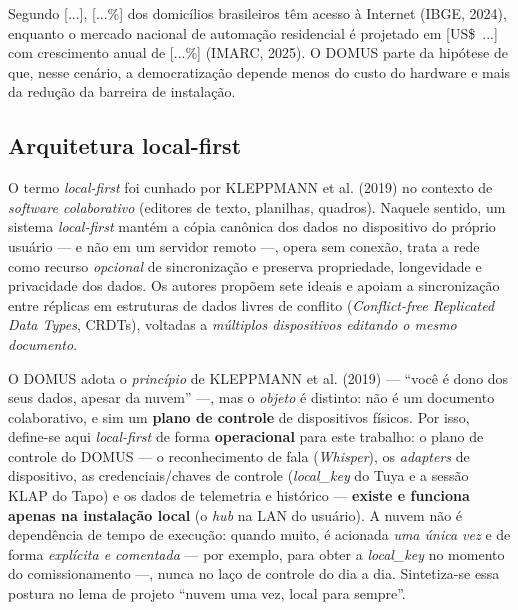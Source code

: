 Segundo [...], [...\%] dos domicílios brasileiros têm acesso à Internet
(IBGE, 2024), enquanto o mercado nacional de automação residencial é projetado em
[US\$~...] com crescimento anual de [...\%] (IMARC, 2025). O DOMUS parte da
hipótese de que, nesse cenário, a democratização depende menos do custo do
hardware e mais da redução da barreira de instalação.

\subsection{Arquitetura local-first}\label{sec:local-first}

O termo \textit{local-first} foi cunhado por KLEPPMANN et al. (2019) no contexto
de \textit{software colaborativo} (editores de texto, planilhas, quadros). Naquele
sentido, um sistema \textit{local-first} mantém a cópia canônica dos dados no
dispositivo do próprio usuário --- e não em um servidor remoto ---, opera sem
conexão, trata a rede como recurso \textit{opcional} de sincronização e preserva
propriedade, longevidade e privacidade dos dados. Os autores propõem sete ideais e
apoiam a sincronização entre réplicas em estruturas de dados livres de conflito
(\textit{Conflict-free Replicated Data Types}, CRDTs), voltadas a \textit{múltiplos
dispositivos editando o mesmo documento}.

O DOMUS adota o \textit{princípio} de KLEPPMANN et al. (2019) --- ``você é dono dos
seus dados, apesar da nuvem'' ---, mas o \textit{objeto} é distinto: não é um
documento colaborativo, e sim um \textbf{plano de controle} de dispositivos
físicos. Por isso, define-se aqui \textit{local-first} de forma \textbf{operacional}
para este trabalho: o plano de controle do DOMUS --- o reconhecimento de fala
(\textit{Whisper}), os \textit{adapters} de dispositivo, as credenciais/chaves de
controle (\textit{local\_key} do Tuya e a sessão KLAP do Tapo) e os dados de
telemetria e histórico --- \textbf{existe e funciona apenas na instalação local}
(o \textit{hub} na LAN do usuário). A nuvem não é dependência de tempo de execução:
quando muito, é acionada \textit{uma única vez} e de forma \textit{explícita e
comentada} --- por exemplo, para obter a \textit{local\_key} no momento do
comissionamento ---, nunca no laço de controle do dia a dia. Sintetiza-se essa
postura no lema de projeto ``nuvem uma vez, local para sempre''.

